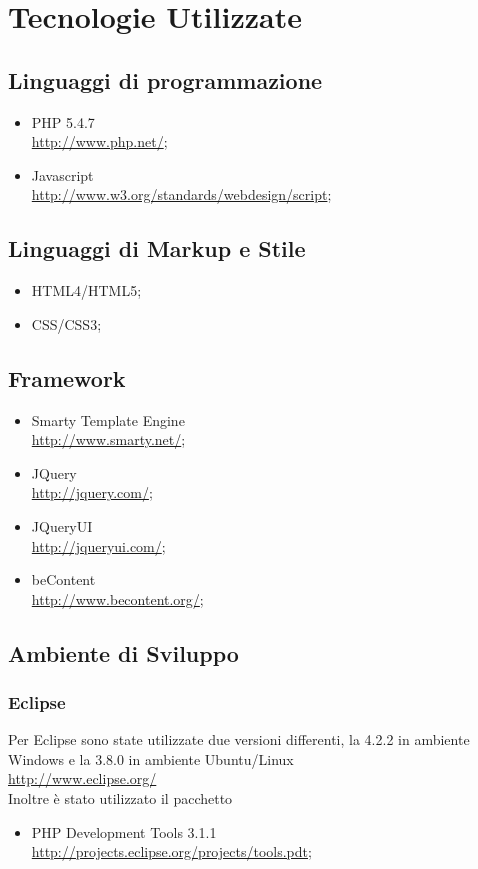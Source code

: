 \chapter{Tecnologie Utilizzate}
  \section{Linguaggi di programmazione}
    \begin{itemize}
     \item PHP 5.4.7 \\
     \href{http://www.php.net/}{http://www.php.net/};
     \item Javascript \\
     \href{http://www.w3.org/standards/webdesign/script}{http://www.w3.org/standards/webdesign/script};
    \end{itemize}
   \section{Linguaggi di Markup e Stile}
    \begin{itemize}
     \item HTML4/HTML5;
     \item CSS/CSS3;
    \end{itemize}
   \section{Framework}
    \begin{itemize}
     \item Smarty Template Engine \\
	\href{http://www.smarty.net/}{http://www.smarty.net/};
     \item JQuery\\
	\href{http://jquery.com/}{http://jquery.com/};
     \item JQueryUI\\
	\href{http://jqueryui.com/}{http://jqueryui.com/};
     \item beContent\\
	\href{http://www.becontent.org/}{http://www.becontent.org/};
    \end{itemize}
   \section{Ambiente di Sviluppo}
    \subsection{Eclipse}
      Per Eclipse sono state utilizzate due versioni differenti, la 4.2.2 in ambiente Windows e la 3.8.0 in ambiente Ubuntu/Linux \\
      \href{http://www.eclipse.org/}{http://www.eclipse.org/} \\
      Inoltre è stato utilizzato il pacchetto
      \begin{itemize}
       \item PHP Development Tools 3.1.1 \\
       \href{http://projects.eclipse.org/projects/tools.pdt}{http://projects.eclipse.org/projects/tools.pdt};
       
      \end{itemize}
